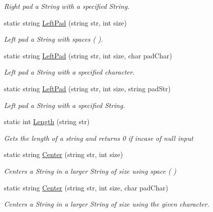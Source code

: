 \begin{DoxyCompactItemize}
\begin{DoxyCompactList}\small\item\em Right pad a String with a specified String. \end{DoxyCompactList}\item 
static string \hyperlink{class_ultimate_1_1_utilities_1_1_string_utils_a2207ff3db5f945df8c95f48559b075de}{Left\+Pad} (string str, int size)
\begin{DoxyCompactList}\small\item\em Left pad a String with spaces (\textquotesingle{} \textquotesingle{}). \end{DoxyCompactList}\item 
static string \hyperlink{class_ultimate_1_1_utilities_1_1_string_utils_a58f3542b8d72a629968a556dbb72ecf0}{Left\+Pad} (string str, int size, char pad\+Char)
\begin{DoxyCompactList}\small\item\em Left pad a String with a specified character. \end{DoxyCompactList}\item 
static string \hyperlink{class_ultimate_1_1_utilities_1_1_string_utils_a1229cd2f83aac8273e2970cd9d0bc8e2}{Left\+Pad} (string str, int size, string pad\+Str)
\begin{DoxyCompactList}\small\item\em Left pad a String with a specified String. \end{DoxyCompactList}\item 
static int \hyperlink{class_ultimate_1_1_utilities_1_1_string_utils_a61c72b158968df09f92d50a108c9e358}{Length} (string str)
\begin{DoxyCompactList}\small\item\em Gets the length of a string and returns 0 if incase of null input \end{DoxyCompactList}\item 
static string \hyperlink{class_ultimate_1_1_utilities_1_1_string_utils_a2e0b05979861d70ef5d7f8e6fc7c090d}{Center} (string str, int size)
\begin{DoxyCompactList}\small\item\em Centers a String in a larger String of size using space (\textquotesingle{} \textquotesingle{}) \end{DoxyCompactList}\item 
static string \hyperlink{class_ultimate_1_1_utilities_1_1_string_utils_a195ad7aa552db0dac7e718181330f426}{Center} (string str, int size, char pad\+Char)
\begin{DoxyCompactList}\small\item\em Centers a String in a larger String of size using the given character. \end{DoxyCompactList}\item 

\end{DoxyCompactItemize}
